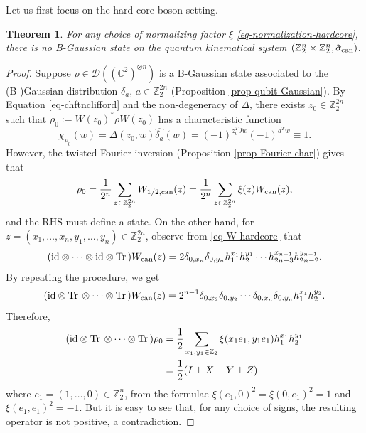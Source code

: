\documentclass[12pt,reqno]{amsart}
\newtheorem{thm}{Theorem}
\theoremstyle{definition}
\theoremstyle{definition}
\theoremstyle{definition}
\numberwithin{thm}{section}
\numberwithin{equation}{section}
\newcommand{\Comp}{\mathbb{C}}
\newcommand{\D}{\mathcal{D}}
\newcommand{\z}{\mathbb{Z}}
\newcommand{\tr}{{\rm Tr}\,}
\newcommand{\id}{{\rm id}}
\newcommand{\tcr}[1]{\textcolor{red}{#1}}
\begin{document}
Let us first focus on the hard-core boson setting.

\begin{thm} \label{thm-hardcore-nonGauss}
   For any choice of normalizing factor $\xi$ \eqref{eq-normalization-hardcore}, there is no B-Gaussian state on the quantum kinematical system $(\z_2^n\times \z_2^n, \tilde{\sigma}_{\rm can})$.
\end{thm}

\begin{proof}
    Suppose $\rho\in \D((\Comp^2)^{\otimes n})$ is a B-Gaussian state associated to the (B-)Gaussian distribution $\delta_a$, $a\in \z_2^{2n}$ (Proposition \ref{prop-qubit-Gaussian}). By Equation \eqref{eq-chftnclifford} and the non-degeneracy of $\Delta$, there exists $z_0\in \z_2^{2n}$ such that $\rho_0:=W(z_0)^*\rho W(z_0)$ has a characteristic function
        $$\chi_{\rho_0}(w)=\overline{\Delta(z_0,w)}\widehat{\delta_a}(w)=(-1)^{z_0^T J w}(-1)^{a^T w}\equiv 1.$$
    However, the twisted Fourier inversion (Proposition \ref{prop-Fourier-char}) gives that
        $$\rho_0=\frac{1}{2^n}\sum_{z\in \z_2^{2n}} W_{1/2, \rm can}(z)=\frac{1}{2^n}\sum_{z\in \z_2^{2n}} \xi(z)W_{\rm can}(z),$$
    and the RHS must define a state. On the other hand, for $z=(x_1,\ldots, x_n, y_1,\ldots, y_n)\in \z_2^{2n}$, observe from \eqref{eq-W-hardcore} that
    $$(\id\otimes\cdots\otimes\id\otimes\tr)W_{\rm can}(z)=2\delta_{0,x_{n}}\delta_{0,y_{n}} h^{x_1}_1 h^{y_1}_2\cdots h^{x_{n-1}}_{2n-3}h^{y_{n-1}}_{2n-2}.$$
    By repeating the procedure, we get
        $$(\id\otimes\tr\otimes\cdots\otimes\tr)W_{\rm can}(z )=2^{n-1}\delta_{0,x_{2}}\delta_{0,y_{2}}\cdots\delta_{0,x_{n}}\delta_{0,y_{n}} h^{x_1}_1 h^{y_2}_2.$$
    Therefore,
    \begin{align*}
        (\id\otimes\tr\otimes\cdots\otimes\tr)\rho_0&=\frac{1}{2}\sum_{x_1,y_1\in \z_2} \xi(x_1e_1,y_1e_1)h^{x_1}_1h^{y_1}_2\\
            &=\frac{1}{2}(I\pm X\pm Y\pm Z)
    \end{align*}
    where $e_1=(1,\ldots, 0)\in \z_2^n$, from the formulae $\xi(e_1,0)^2=\xi(0, e_1)^2=1$ and $\xi(e_1,e_1)^2=-1$. But it is easy to see that, for any choice of signs, the resulting operator is not positive, a contradiction.

\end{proof}
\end{document}

